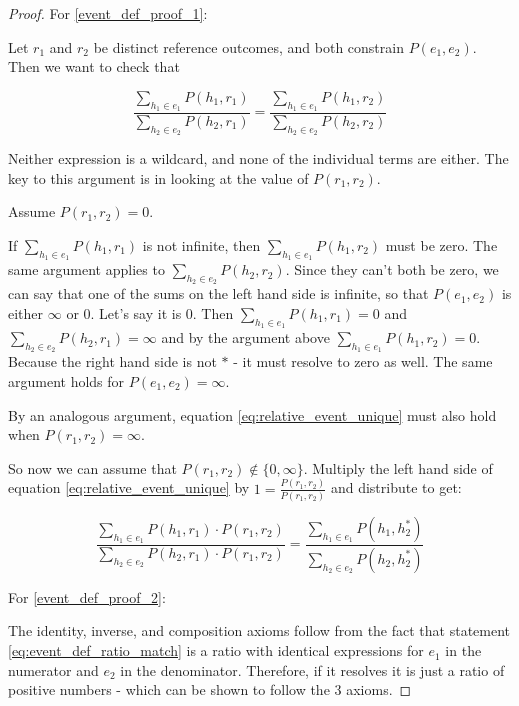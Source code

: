 \documentclass[twoside]{article}
\theoremstyle{plain}%
\theoremstyle{definition}
\theoremstyle{remark}
\begin{document}
\begin{proof}
For \ref{event_def_proof_1}:

Let \(r_1\) and \(r_2\) be distinct reference outcomes, and both constrain \(P(e_1, e_2)\). Then we want to check that

\begin{equation}
\label{eq:relative_event_unique}
\frac{\sum_{h_1 \in e_1} P(h_1, r_1)}{\sum_{h_2 \in e_2} P(h_2, r_1)} = \frac{\sum_{h_1 \in e_1} P(h_1, r_2)}{\sum_{h_2 \in e_2} P(h_2, r_2)}
\end{equation}

Neither expression is a wildcard, and none of the individual terms are either. The key to this argument is in looking at the value of \(P(r_1, r_2)\).

Assume \(P(r_1, r_2) = 0\). 

If \(\sum_{h_1 \in e_1} P(h_1, r_1)\) is not infinite, then \(\sum_{h_1 \in e_1} P(h_1, r_2)\) must be zero. The same argument applies to \(\sum_{h_2 \in e_2} P(h_2, r_2)\). Since they can't both be zero, we can say that one of the sums on the left hand side is infinite, so that \(P(e_1, e_2)\) is either \(\infty\) or 0. Let's say it is 0. Then \(\sum_{h_1 \in e_1} P(h_1, r_1) = 0\) and \(\sum_{h_2 \in e_2} P(h_2, r_1) = \infty\) and by the argument above \(\sum_{h_1 \in e_1} P(h_1, r_2) = 0\). Because the right hand side is not \(\ast\) - it must resolve to zero as well. The same argument holds for \(P(e_1, e_2) = \infty\).

By an analogous argument, equation \ref{eq:relative_event_unique} must also hold when \(P(r_1, r_2) = \infty\).

So now we can assume that \(P(r_1, r_2) \notin \{0, \infty\} \). Multiply the left hand side of equation \ref{eq:relative_event_unique} by \(1 = \frac{P(r_1, r_2)}{P(r_1, r_2)}\) and distribute to get:

\[\frac{\sum_{h_1 \in e_1} P(h_1, r_1) \cdot P(r_1, r_2)}{\sum_{h_2 \in e_2} P(h_2, r_1) \cdot P(r_1, r_2)} = \frac{\sum_{h_1 \in e_1} P(h_1, h_2^*)}{\sum_{h_2 \in e_2} P(h_2, h_2^*)}\]

For \ref{event_def_proof_2}:

The identity, inverse, and composition axioms follow from the fact that statement \ref{eq:event_def_ratio_match} is a ratio with identical expressions for \(e_1\) in the numerator and \(e_2\) in the denominator. Therefore, if it resolves it is just a ratio of positive numbers - which can be shown to follow the 3 axioms.
\end{proof}
\end{document}

